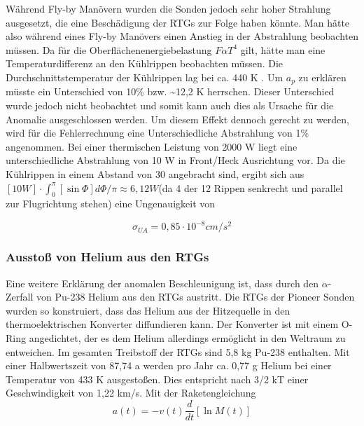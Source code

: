 W\"ahrend Fly-by Man\"overn wurden die Sonden jedoch sehr hoher
Strahlung ausgesetzt, die eine Besch\"adigung der RTGs zur Folge haben
k\"onnte. Man h\"atte also w\"ahrend eines Fly-by Man\"overs einen
Anstieg in der Abstrahlung beobachten m\"ussen. Da f\"ur die
Oberfl\"achenenergiebelastung $F\alpha T^{4}$ gilt, h\"atte man eine
Temperaturdifferenz an den K\"uhlrippen beobachten m\"ussen. Die
Durchschnittstemperatur der K\"uhlrippen lag bei ca. 440 K \cite{Anderson2002}. Um 
$a_{p}$ zu erkl\"aren m\"usste ein Unterschied von 10\% bzw. \~{}12,2 K
herrschen. Dieser Unterschied wurde jedoch nicht beobachtet und somit
kann auch dies als Ursache f\"ur die Anomalie ausgeschlossen werden. Um
diesem Effekt dennoch gerecht zu werden, wird f\"ur die Fehlerrechnung
eine Unterschiedliche Abstrahlung von 1\% angenommen. Bei einer
thermischen Leistung von 2000 W liegt eine unterschiedliche Abstrahlung
von 10 W in Front/Heck Ausrichtung vor. Da die K\"uhlrippen in einem
Abstand von 30{\textdegree} angebracht sind, ergibt sich aus 
$[10W]\cdot \int _{0}^{\pi }[\sin \Phi ]d\Phi /\pi \approx
6,12W$\cite{Anderson2002}(da 4 der 12 Rippen senkrecht und parallel zur Flugrichtung
stehen) eine Ungenauigkeit von

\begin{equation}
\sigma _{\mathit{UA}}=0,85\cdot 10^{-8}\mathit{cm}/s^{2}
\end{equation}


\bigskip

\subsubsection{ Aussto{\ss} von Helium aus den RTGs}

Eine weitere Erkl\"arung der anomalen Beschleunigung ist, dass durch den
$\alpha ${}-Zerfall von Pu-238 Helium aus den RTGs austritt. Die RTGs
der Pioneer Sonden wurden so konstruiert, dass das Helium aus der
Hitzequelle in den thermoelektrischen Konverter diffundieren kann. Der
Konverter ist mit einem O-Ring angedichtet, der es dem Helium
allerdings erm\"oglicht in den Weltraum zu entweichen. Im gesamten
Treibstoff der RTGs sind 5,8 kg Pu-238 enthalten\cite{Anderson2002}. Mit einer
Halbwertszeit von 87,74 a werden pro Jahr ca. 0,77 g Helium bei einer
Temperatur von 433 K ausgesto{\ss}en. Dies entspricht nach 3/2 kT einer
Geschwindigkeit von 1,22 km/s. Mit der Raketengleichung
\begin{equation}
a(t)=-v(t)\frac{d}{\mathit{dt}}[\ln M(t)]
\end{equation}

